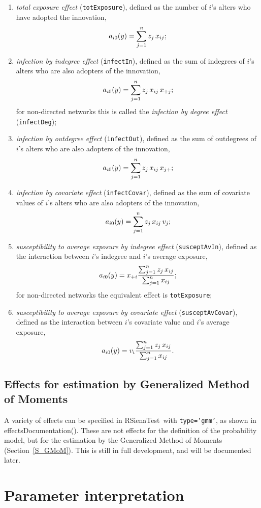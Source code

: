 \documentclass[a4paper,fleqn,11pt]{article}
\newcommand{\+}{\, + \,}
\newcommand{\rst}{{\sf RSienaTest}}
\newcommand{\vit}{\theenumi}
\begin{document}
\begin{enumerate}
\item \emph{total exposure effect} (\verb|totExposure|), defined as the
 number of $i$'s alters who have adopted the innovation,
\[
a_{i\vit}(y) = \sum_{j=1}^n z_j\, x_{ij} ;
\]
\item \emph{infection by indegree effect} (\verb|infectIn|),
  defined as the sum of indegrees of $i$'s alters who are also adopters of the innovation,
\[
a_{i\vit}(y)=\sum_{j=1}^n z_j \,x_{ij}\, x_{+j};
\]
  for non-directed networks this is called the
   \emph{infection by degree effect} (\verb|infectDeg|);
\item \emph{infection by outdegree effect} (\verb|infectOut|),
 defined as the sum of outdegrees of $i$'s alters who are also adopters of the innovation,
\[
a_{i\vit}(y)=\sum_{j=1}^n z_j\, x_{ij}\, x_{j+};
\]
\item \emph{infection by covariate effect} (\verb|infectCovar|),
 defined as the sum of covariate values of $i$'s alters who are also adopters of the innovation,
\[
a_{i\vit}(y)=\sum_{j=1}^n z_j\, x_{ij}\, v_j;
\]
\item \emph{susceptibility to average exposure by indegree effect} (\verb|susceptAvIn|),
 defined as the interaction between $i$'s indegree and $i$'s average exposure,
\[
a_{i\vit}(y)=x_{+i} \frac{\sum_{j=1}^n z_j\, x_{ij}}{\sum_{j=1}^n x_{ij}};
\]
  for non-directed networks the equivalent effect is \verb|totExposure|;

\item \emph{susceptibility to average exposure by covariate effect} (\verb|susceptAvCovar|),
  defined as the interaction between $i$'s covariate value and $i$'s  average exposure,
\[
a_{i\vit}(y)=v_{i} \frac{\sum_{j=1}^n z_j\, x_{ij}}{\sum_{j=1}^n x_{ij}}.
\]

\end{enumerate}

\subsection{Effects for estimation by Generalized Method of Moments}

A variety of effects can be specified in \rst\ with \texttt{type='gmm'},
as shown in \textsf{effectsDocumentation()}.
These are not effects for the definition of the probability model,
but for the estimation by the Generalized Method of Moments
(Section~\ref{S_GMoM}).
This is still in full development, and will be documented later.

\newpage
\section{Parameter interpretation}
\label{S_interpret}
\end{document}
